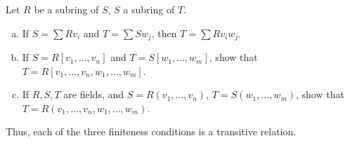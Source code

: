 \documentclass[10pt]{mypackage}
\begin{document}
\begin{exercise}[Exercise 1.45]
  Let $R$ be a subring of $S$, $S$ a subring of $T$.
  \begin{enumerate}[(a)]
    \item If $S = \sum Rv_i$ and $T = \sum Sw_j$, then $T = \sum Rv_iw_j$.
    \item If $S = R\left[ v_1,\dots,v_n \right]$ and $T = S\left[ w_1,\dots,w_m \right]$, show that $T = R\left[ v_1,\dots,v_n,w_1,\dots,w_m \right]$.
    \item If $R,S,T$ are fields, and $S = R\left( v_1,\dots,v_n \right)$, $T = S\left( w_1,\dots,w_m \right)$, show that $T = R\left( v_1,\dots,v_n,w_1,\dots,w_m \right)$.
  \end{enumerate}
  Thus, each of the three finiteness conditions is a transitive relation.
\end{exercise}
\end{document}
